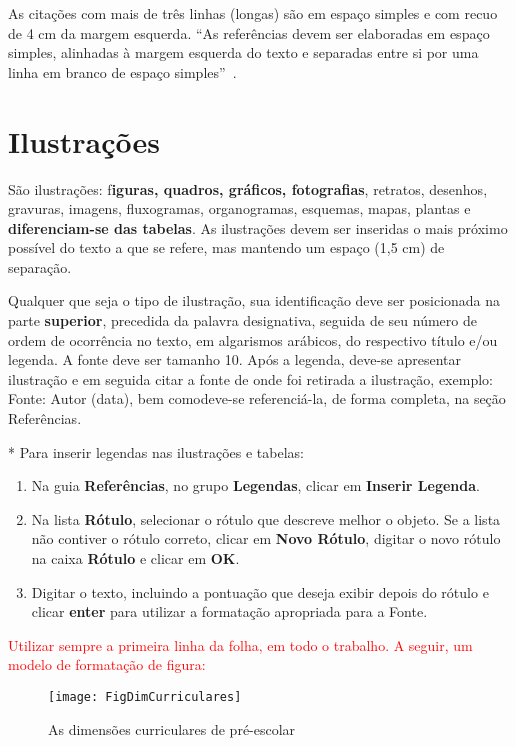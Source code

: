 As citações com mais de três linhas (longas) são em espaço simples e com recuo de 4 cm da margem esquerda. ``As referências devem ser elaboradas em espaço simples, alinhadas à margem esquerda do texto e separadas entre si por uma linha em branco de espaço simples''~\cite{NBR6023:2018}.

\section{Ilustrações}

São ilustrações: f\textbf{iguras, quadros, gráficos, fotografias}, retratos, desenhos, gravuras, imagens, fluxogramas, organogramas, esquemas, mapas, plantas e \textbf{diferenciam-se das tabelas}. As ilustrações devem ser inseridas o mais próximo possível do texto a que se refere, mas mantendo um espaço (1,5 cm) de separação.

Qualquer que seja o tipo de ilustração, sua identificação deve ser posicionada na parte \textbf{superior}, precedida da palavra designativa, seguida de seu número de ordem de ocorrência no texto, em algarismos arábicos, do respectivo título e/ou legenda. A fonte deve ser tamanho 10. Após a legenda, deve-se apresentar ilustração e em seguida citar a fonte de onde foi retirada a ilustração, exemplo: Fonte: Autor (data), bem comodeve-se referenciá-la, de forma completa, na seção Referências. 

* Para inserir legendas nas ilustrações e tabelas: 

\begin{enumerate}
    \item Na guia \textbf{Referências}, no grupo \textbf{Legendas}, clicar em \textbf{Inserir Legenda}.
    \item Na lista \textbf{Rótulo}, selecionar o rótulo que descreve melhor o objeto. Se a lista não contiver o rótulo correto, clicar em \textbf{Novo Rótulo}, digitar o novo rótulo na caixa \textbf{Rótulo} e clicar em \textbf{OK}.
    \item Digitar o texto, incluindo a pontuação que deseja exibir depois do rótulo e clicar \textbf{enter} para utilizar a formatação apropriada para a Fonte.
\end{enumerate}

\textcolor{red}{Utilizar sempre a primeira linha da folha, em todo o trabalho. A seguir, um modelo de formatação de figura:}

\newpage



\begin{figure}[!htb]%
     \caption{As dimensões curriculares de pré-escolar}%
     \label{fig:exemplo2}%
     \texttt{[image: FigDimCurriculares]}%
 \end{figure}

